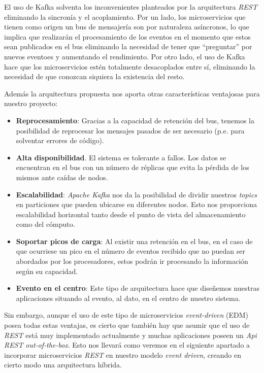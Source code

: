 El uso de Kafka solventa los inconvenientes planteados por la arquitectura \textit{REST} eliminando la sincronía y el acoplamiento. Por un lado, los microservicios que tienen como origen un bus de mensajería son por naturaleza asíncronos, lo que implica que realizarán el procesamiento de los eventos en el momento que estos sean publicados en el bus eliminando la necesidad de tener que ``preguntar'' por nuevos eventoes y aumentando el rendimiento. Por otro lado, el uso de Kafka hace que los microservicios estén totalmente desacoplados entre sí, eliminando la necesidad de que conozcan siquiera la existencia del resto. 

Además la arquitectura propuesta nos aporta otras características ventajosas para nuestro proyecto:

\begin{itemize}
	\item \textbf{Reprocesamiento}: Gracias a la capacidad de retención del bus, tenemos la posibilidad de reprocesar los mensajes pasados de ser necesario (p.e. para solventar errores de código).  
	\item \textbf{Alta disponibilidad}. El sistema es tolerante a fallos. Los datos se encuentran en el bus con un número de réplicas que evita la pérdida de los mismos ante caídas de nodos.
	\item \textbf{Escalabilidad}: \textit{Apache Kafka} nos da la posibilidad de dividir nuestros \textit{topics} en particiones que pueden ubicarse en diferentes nodos. Esto nos proporciona escalabilidad horizontal tanto desde el punto de vista del almacenamiento como del cómputo.
	\item\textbf{ Soportar picos de carga}: Al existir una retención en el bus, en el caso de que ocurriese un pico en el número de eventos recibido que no puedan ser abordados por los procesadores, estos podrán ir procesando la información según su capacidad.
	\item \textbf{Evento en el centro}: Este tipo de arquitectura hace que diseñemos nuestras aplicaciones situando al evento, al dato, en el centro de nuestro sistema.
\end{itemize}


Sin embargo, aunque el uso de este tipo de microservicios  \textit{event-driven} (EDM) posea todas estas ventajas, es cierto que también hay que asumir que el uso de \textit{REST} está muy implementado actualmente y muchas aplicaciones poseen un \textit{Api REST} \textit{out-of-the-box}. Esto nos llevará como veremos en el siguiente apartado a incorporar microservicios \textit{REST} en nuestro modelo \textit{event driven}, creando en cierto modo una arquitectura híbrida.





